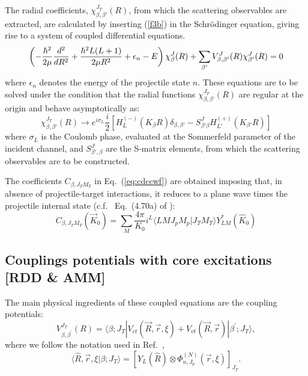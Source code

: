 \documentclass[preprint,12pt]{elsarticle}
\begin{document}
The radial coefficients,  $\chi_{\beta,\beta'}^{J_T}(R)$, from which the
scattering observables are extracted, are calculated  
by inserting (\ref{f3b}) in the Schr\"odinger equation, giving rise to
a system of coupled differential equations. 
\begin{equation}
\left(-{\hbar^2 \over 2 \mu}{d^2 \over dR^2}+ {\hbar^2 L(L+1)\over 2 \mu R^2} +
 \epsilon_n -E\right)  \chi^{J}_{\beta}(R) 
+ \sum_{\beta'} V_{\beta,\beta'}^J(R) \chi^{J}_{\beta'}(R)  =  0 
\end{equation}
%
where $ \epsilon_n$ denotes the energy of the projectile state $n$. 
These equations are to be solved under the condition that the radial functions $\chi_{\beta,\beta'}^{J_T}(R)$ are regular at the origin and behave asymptotically as:
\begin{equation}
\chi_{\beta,\beta'}^{J_T}(R) \rightarrow e^{i \sigma_L }\frac{i}{2} \left[H^{(-)}_L (K_\beta R)  \delta_{\beta, \beta'} - S^J_{\beta' \beta} H^{(+)}_{L'}(K_{\beta'} R)  \right]
\end{equation}
where $\sigma_L$ is the Coulomb phase, evaluated at the Sommerfeld parameter of the incident channel, and $S^J_{\beta',\beta}$ are the S-matrix elements, from which the scattering observables are to be constructed.

The coefficients $C_{\beta,J_T M_T}$ in Eq.~(\ref{eq:cdccwf}) are obtained imposing that, in absence of projectile-target interactions, it reduces to a plane wave times the projectile internal state (c.f.~ Eq.~(4.70a) of \cite{Sat83}): 
\begin{equation}
C_{\beta,J_T M_T}(\vec{K}_0) = \sum_{M} \frac{4 \pi}{K_0} i^L \langle L M  J_p M_p | J_T M_T \rangle Y^{*}_{L M}(\hat{K}_0)
\end{equation}




\subsection{Couplings potentials with core excitations [RDD \& AMM]}
 The main physical ingredients of these coupled equations are the coupling potentials: 
%
\begin{equation}
V_{\beta,\beta^\prime}^{J_T}(R)=\langle \beta;
J_T|V_{ct}(\vec{R},\vec{r},\xi)+V_{vt}(\vec{R},\vec{r})|\beta^\prime;
J_T\rangle , 
\label{cpot}
\end{equation}
where we follow the notation used in Ref.~\cite{Summers06},
\begin{equation}
\langle \hat{R}, \vec{r}, \xi |\beta; J_T\rangle =
\left[Y_L({\hat{R}})\otimes\Phi^{(N)}_{n,J_p}(\vec{r},\xi)\right]_{J_T}. 
\label{coupledbasis}
\end{equation}
\end{document}
